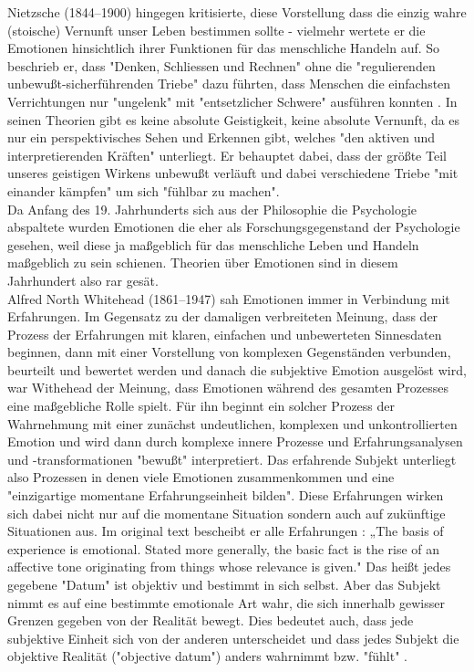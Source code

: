 Nietzsche (1844–1900) hingegen kritisierte, diese Vorstellung dass die einzig wahre (stoische) Vernunft unser Leben bestimmen sollte - vielmehr wertete er die Emotionen hinsichtlich ihrer Funktionen für das menschliche Handeln auf. So beschrieb er, dass "Denken, Schliessen und Rechnen" ohne die "regulierenden unbewußt-sicherführenden Triebe" dazu führten, dass Menschen die einfachsten Verrichtungen nur "ungelenk" mit "entsetzlicher Schwere" ausführen konnten \cite{nietzsche_zur_2012}. In seinen Theorien gibt es keine absolute Geistigkeit, keine absolute Vernunft, da es nur ein perspektivisches Sehen und Erkennen gibt, welches "den aktiven und interpretierenden Kräften" unterliegt. Er behauptet dabei, dass der größte Teil unseres geistigen Wirkens unbewußt verläuft und dabei verschiedene Triebe "mit einander kämpfen" um sich "fühlbar zu machen"\cite{nietzsche_frohliche_1887}.\cite{werner_stegmaier_nietzsche:_nodate}\\
Da Anfang des 19. Jahrhunderts sich aus der Philosophie die Psychologie abspaltete wurden Emotionen die eher als Forschungsgegenstand der Psychologie gesehen, weil diese ja maßgeblich für das menschliche Leben und Handeln maßgeblich zu sein schienen. Theorien über Emotionen sind in diesem Jahrhundert also rar gesät.\\ 


Alfred North Whitehead (1861–1947) sah Emotionen immer in Verbindung mit Erfahrungen. Im Gegensatz zu der damaligen verbreiteten Meinung, dass der Prozess der Erfahrungen mit klaren, einfachen und unbewerteten Sinnesdaten beginnen, dann mit einer Vorstellung von komplexen Gegenständen verbunden, beurteilt und bewertet werden und danach die subjektive Emotion ausgelöst wird, war Withehead der Meinung, dass Emotionen während des gesamten Prozesses eine maßgebliche Rolle spielt. Für ihn beginnt ein solcher Prozess der Wahrnehmung mit einer zunächst undeutlichen, komplexen und unkontrollierten Emotion und wird dann durch komplexe innere Prozesse und Erfahrungsanalysen  und -transformationen "bewußt" interpretiert. Das erfahrende Subjekt unterliegt also Prozessen in denen viele Emotionen zusammenkommen und eine "einzigartige momentane Erfahrungseinheit bilden"\cite{maria-sibylla_lotter_whitehead:_nodate}. Diese Erfahrungen wirken sich dabei nicht nur auf die momentane Situation sondern auch auf zukünftige Situationen aus. Im original text bescheibt er alle Erfahrungen \cite{alfred_north_whitehead_adventures_1967}: „The  basis  of  experience  is  emotional.  Stated  more  generally,  the  basic  fact  is  the  rise  of  an  affective  tone  originating  from  things whose relevance is given." Das heißt jedes gegebene "Datum" ist objektiv und bestimmt in sich selbst. Aber das Subjekt nimmt es auf eine bestimmte emotionale Art wahr, die sich innerhalb gewisser Grenzen gegeben von der Realität bewegt. Dies bedeutet auch, dass jede subjektive Einheit sich von der anderen unterscheidet und dass jedes Subjekt die objektive Realität ("objective datum") anders wahrnimmt bzw. "fühlt" \cite{shaviro_without_2012}.\\   


